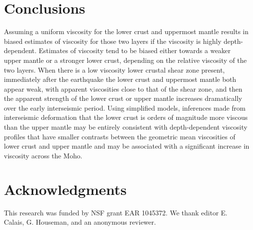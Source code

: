 \section{Conclusions}
  Assuming a uniform viscosity for the lower crust and uppermost mantle results in biased estimates of viscosity for those two layers if the viscosity is highly depth-dependent.  Estimates of viscosity tend to be biased either towards a weaker upper mantle or a stronger lower crust, depending on the relative viscosity of the two layers.  When there is a low viscosity lower crustal shear zone present, immediately after the earthquake the lower crust and uppermost mantle both appear weak, with apparent viscosities close to that of the shear zone, and then the apparent strength of the lower crust or upper mantle increases dramatically over the early interseismic period.  Using simplified models, inferences made from interseismic deformation that the lower crust is orders of magnitude more viscous than the upper mantle may be entirely consistent with depth-dependent viscosity profiles that have smaller contrasts between the geometric mean viscosities of lower crust and upper mantle and may be associated with a significant increase in viscosity across the Moho.

\section{Acknowledgments}
This research was funded by NSF grant EAR 1045372. We thank editor E. Calais, G. Houseman, and an anonymous reviewer.








